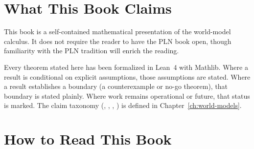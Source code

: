 \documentclass[11pt,openany]{report}
\begin{document}
\section{What This Book Claims}

This book is a self-contained mathematical presentation of the
world-model calculus.  It does not require the reader to have the PLN
book open, though familiarity with the PLN tradition will enrich the
reading.

Every theorem stated here has been formalized in Lean~4 with Mathlib.
Where a result is conditional on explicit assumptions, those
assumptions are stated.  Where a result establishes a boundary (a
counterexample or no-go theorem), that boundary is stated plainly.
Where work remains operational or future, that status is marked.  The
claim taxonomy (\claimCore{}, \claimConditional{}, \claimBoundary{},
\claimOperational{}) is defined in
Chapter~\ref{ch:world-models}.

\begin{center}
\end{center}


\section{How to Read This Book}
\label{sec:reading-guide}
\end{document}
